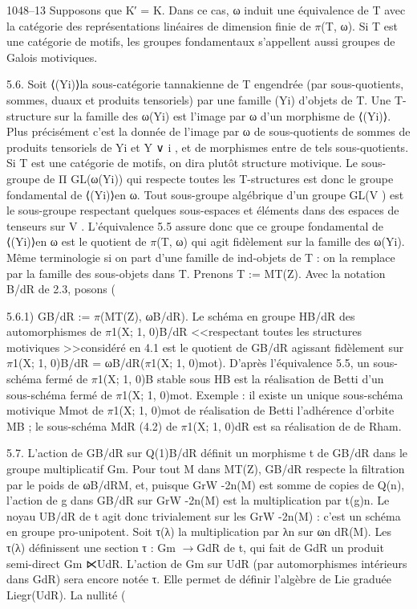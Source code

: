 \documentclass[11pt]{article}
\begin{document}
1048--13 Supposons que K′ = K. Dans ce cas, ω induit une équivalence de T avec la catégorie des représentations linéaires de dimension finie de \(\pi\)(T, ω). Si T est une catégorie de motifs, les groupes fondamentaux s’appellent aussi groupes de Galois motiviques. 

5.6. Soit ⟨(Yi)⟩la sous-catégorie tannakienne de T engendrée (par sous-quotients, sommes, duaux et produits tensoriels) par une famille (Yi) d’objets de T. Une T-structure sur la famille des ω(Yi) est l’image par ω d’un morphisme de ⟨(Yi)⟩. Plus précisément c’est la donnée de l’image par ω de sous-quotients de sommes de produits tensoriels de Yi et Y ∨ i , et de morphismes entre de tels sous-quotients. Si T est une catégorie de motifs, on dira plutôt structure motivique. Le sous-groupe de Π GL(ω(Yi)) qui respecte toutes les T-structures est donc le groupe fondamental de ⟨(Yi)⟩en ω. Tout sous-groupe algébrique d’un groupe GL(V ) est le sous-groupe respectant quelques sous-espaces et éléments dans des espaces de tenseurs sur V . L’équivalence 5.5 assure donc que ce groupe fondamental de ⟨(Yi)⟩en ω est le quotient de \(\pi\)(T, ω) qui agit fidèlement sur la famille des ω(Yi). Même terminologie si on part d’une famille de ind-objets de T : on la remplace par la famille des sous-objets dans T. Prenons T := MT(Z). Avec la notation B/dR de 2.3, posons (

5.6.1) GB/dR := \(\pi\)(MT(Z), ωB/dR). Le schéma en groupe HB/dR des automorphismes de \(\pi\)1(X; 1, 0)B/dR <<respectant toutes les structures motiviques >>considéré en 4.1 est le quotient de GB/dR agissant fidèlement sur \(\pi\)1(X; 1, 0)B/dR = ωB/dR(\(\pi\)1(X; 1, 0)mot). D’après l’équivalence 5.5, un sous-schéma fermé de \(\pi\)1(X; 1, 0)B stable sous HB est la réalisation de Betti d’un sous-schéma fermé de \(\pi\)1(X; 1, 0)mot. Exemple : il existe un unique sous-schéma motivique Mmot de \(\pi\)1(X; 1, 0)mot de réalisation de Betti l’adhérence d’orbite MB ; le sous-schéma MdR (4.2) de \(\pi\)1(X; 1, 0)dR est sa réalisation de de Rham. 

5.7. L’action de GB/dR sur Q(1)B/dR définit un morphisme t de GB/dR dans le groupe multiplicatif Gm. Pour tout M dans MT(Z), GB/dR respecte la filtration par le poids de ωB/dRM, et, puisque GrW -2n(M) est somme de copies de Q(n), l’action de g dans GB/dR sur GrW -2n(M) est la multiplication par t(g)n. Le noyau UB/dR de t agit donc trivialement sur les GrW -2n(M) : c’est un schéma en groupe pro-unipotent. Soit τ(λ) la multiplication par λn sur ωn dR(M). Les τ(λ) définissent une section τ : Gm \(\to\)GdR de t, qui fait de GdR un produit semi-direct Gm ⋉UdR. L’action de Gm sur UdR (par automorphismes intérieurs dans GdR) sera encore notée τ. Elle permet de définir l’algèbre de Lie graduée Liegr(UdR). La nullité (
\end{document}
